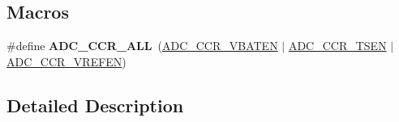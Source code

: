 \subsection*{Macros}
\begin{DoxyCompactItemize}
\item 
\mbox{\label{group___a_d_c___exported___constants_ga2297a78b023d2afe83499724566e6cde}} 
\#define {\bfseries A\+D\+C\+\_\+\+C\+C\+R\+\_\+\+A\+LL}~(\hyperlink{group___peripheral___registers___bits___definition_gaaeefa6f00268db0df10fb97112a9f456}{A\+D\+C\+\_\+\+C\+C\+R\+\_\+\+V\+B\+A\+T\+EN} $\vert$ \hyperlink{group___peripheral___registers___bits___definition_gaec05330012f52f35421531c72819fada}{A\+D\+C\+\_\+\+C\+C\+R\+\_\+\+T\+S\+EN} $\vert$ \hyperlink{group___peripheral___registers___bits___definition_gaecc47464aaa52f565d8daa9cf1a86054}{A\+D\+C\+\_\+\+C\+C\+R\+\_\+\+V\+R\+E\+F\+EN})
\end{DoxyCompactItemize}


\subsection{Detailed Description}
